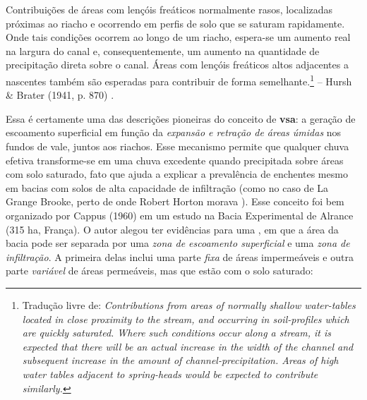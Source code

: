 \documentclass[./main.tex]{subfiles}
\begin{document}
\begin{adjustwidth}{100pt}{0pt}
\medskip
\small Contribuições de áreas com lençóis freáticos normalmente rasos, localizadas próximas ao riacho e ocorrendo em perfis de solo que se saturam rapidamente. Onde tais condições ocorrem ao longo de um riacho, espera-se um aumento real na largura do canal e, consequentemente, um aumento na quantidade de precipitação direta sobre o canal. Áreas com lençóis freáticos altos adjacentes a nascentes também são esperadas para contribuir de forma semelhante.\footnote{Tradução livre de: \textit{Contributions from areas of normally shallow water-tables located in close proximity to the stream, and occurring in soil-profiles which are quickly saturated. Where such conditions occur along a stream, it is expected that there will be an actual increase in the width of the channel and subsequent increase in the amount of channel-precipitation. Areas of high water tables adjacent to spring-heads would be expected to contribute similarly.}} -- Hursh \& Brater (1941, p. 870) \cite{Hursh1941}.
\medskip
\end{adjustwidth}

\noindent Essa é certamente uma das descrições pioneiras do conceito de \textbf{\gls{vsa}}: a geração de escoamento superficial em função da \textit{expansão e retração de áreas úmidas} nos fundos de vale, juntos aos riachos. Esse mecanismo permite que qualquer chuva efetiva transforme-se em uma chuva excedente quando precipitada sobre áreas com solo saturado, fato que ajuda a explicar a prevalência de enchentes mesmo em bacias com solos de alta capacidade de infiltração (como no caso de La Grange Brooke, perto de onde Robert Horton morava \cite{Beven2004c}). Esse conceito foi bem organizado por Cappus (1960) \cite{Cappus1960} em um estudo na Bacia Experimental de Alrance (315 ha, França). O autor alegou ter evidências para uma , em que a área da bacia pode ser separada por uma \textit{zona de escoamento superficial} e uma \textit{zona de infiltração}. A primeira delas inclui uma parte \textit{fixa} de áreas impermeáveis e outra parte \textit{variável} de áreas permeáveis, mas que estão com o solo saturado:
\end{document}
